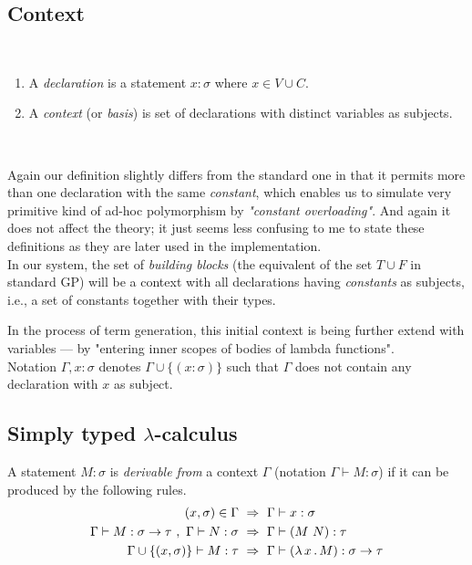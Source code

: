 \documentclass[12pt,a4paper]{report}
\newcommand{\tur}[3]{#1\vdash{}#2:#3}
\begin{document}
	
\subsection{Context}


\begin{definition}
~
\begin{enumerate}
 \item A \textit{declaration} is a statement 
 $x : \sigma$ where $x \in V \cup C$.
  
 \item A \textit{context} (or \textit{basis}) 
 is set of declarations with distinct variables as subjects.
\end{enumerate}~
\end{definition}
    

Again our definition slightly differs from the standard one
in that it permits more than one declaration with the same 
\textit{constant}, which enables us to simulate very primitive
kind of ad-hoc polymorphism by \textit{"constant overloading"}.  
And again it does not affect the theory; it just seems less
confusing to me to state these definitions as they are later 
used in the implementation.   \\

In our system, the set of \textit{building blocks} 
(the equivalent of the set $T \cup F$ in standard GP)
will be a context with all declarations having \textit{constants}
as subjects, i.e., a set of constants together with their types.

In the process of term generation, 
this initial context is being further extend with variables
 --- by "entering inner scopes of bodies of lambda functions".\\   
	

Notation $\Gamma,x:\sigma $ denotes $ \Gamma\cup\{(x:\sigma)\}$ 
such that $\Gamma$ does not contain any declaration with $x$ as subject.

		
\subsection{Simply typed $\lambda$-calculus}

\begin{definition}
A statement $M\colon\sigma$ is \textit{derivable from}
a context $\Gamma$ (notation $\Gamma\vdash{}M\colon\sigma$) 
if it can be produced by the following rules.
\begin{align*}
(x,\sigma) \in \Gamma &~\then~ \tur{\Gamma}{x}{\sigma}\\
\tur{\Gamma}{M}{\sigma \ar \tau}~,~\tur{\Gamma}{N}{\sigma} 
&~\then~ \tur{\Gamma}{(M~N)}{\tau}\\  
\tur{\Gamma \cup \{(x,\sigma)\}}{M}{\tau}
&~\then~ \tur{\Gamma}{\lamb{x}{M}}{\sigma \ar \tau} 
\end{align*}~
\end{definition}
\end{document}
